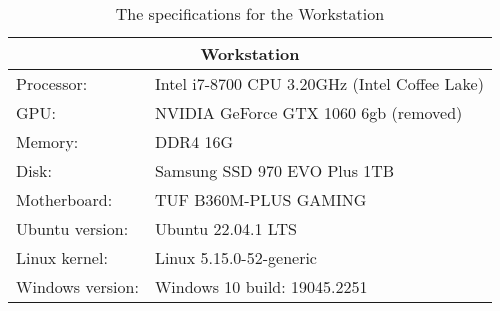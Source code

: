 \begin{table}[H]
    \centering
    \begin{tabular}{ll}
    \hline
    \multicolumn{2}{|c|}{Workstation}           \\ \hline
    Processor:   & Intel i7-8700 CPU 3.20GHz (Intel Coffee Lake)\\
    GPU:         & NVIDIA GeForce GTX 1060 6gb (removed) \\
    Memory:      & DDR4 16G                     \\
    Disk:        & Samsung SSD 970 EVO Plus 1TB \\
    Motherboard: & TUF B360M-PLUS GAMING       \\
    Ubuntu version:  & Ubuntu 22.04.1 LTS        \\
    Linux kernel: & Linux 5.15.0-52-generic       \\
    Windows version:& Windows 10 build: 19045.2251
    \end{tabular}
    \caption{The specifications for the Workstation}
    \label{tab:komplett}
\end{table}